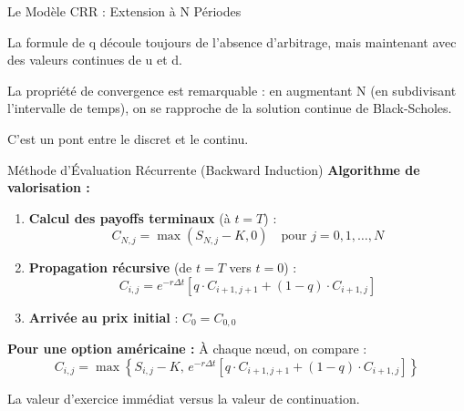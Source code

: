 \documentclass[aspectratio=169, 10pt]{beamer}
\begin{document}
\begin{frame}{Le Modèle CRR : Extension à N Périodes}
{        La formule de q découle toujours de l'absence d'arbitrage,
        mais maintenant avec des valeurs continues de u et d.
        
        La propriété de convergence est remarquable :
        en augmentant N (en subdivisant l'intervalle de temps),
        on se rapproche de la solution continue de Black-Scholes.
        
        C'est un pont entre le discret et le continu.
    }
\end{frame}

\begin{frame}{Méthode d'Évaluation Récurrente (Backward Induction)}
    \textbf{Algorithme de valorisation :}
    
    \begin{enumerate}
        \item \textbf{Calcul des payoffs terminaux} (à $t = T$) :
        $$C_{N,j} = \max(S_{N,j} - K, 0) \quad \text{pour } j = 0, 1, \ldots, N$$
        
        \item \textbf{Propagation récursive} (de $t = T$ vers $t = 0$) :
        $$C_{i,j} = e^{-r\Delta t}\left[q \cdot C_{i+1,j+1} + (1-q) \cdot C_{i+1,j}\right]$$
        
        \item \textbf{Arrivée au prix initial} : $C_0 = C_{0,0}$
    \end{enumerate}
    
    \vspace{0.3cm}
    \textbf{Pour une option américaine :} À chaque nœud, on compare :
    $$C_{i,j} = \max\left\{S_{i,j} - K, \, e^{-r\Delta t}\left[q \cdot C_{i+1,j+1} + (1-q) \cdot C_{i+1,j}\right]\right\}$$
    
    La valeur d'exercice immédiat versus la valeur de continuation.
\end{frame}
\end{document}
